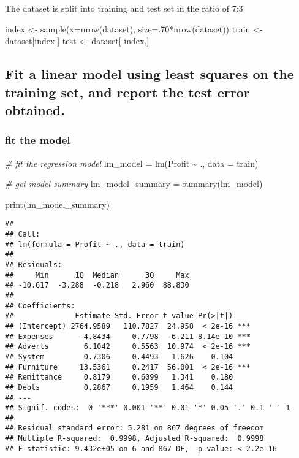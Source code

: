 \documentclass[
]{article}
\newenvironment{Shaded}{\begin{snugshade}}{\end{snugshade}}
\newcommand{\AttributeTok}[1]{\textcolor[rgb]{0.77,0.63,0.00}{#1}}
\newcommand{\CommentTok}[1]{\textcolor[rgb]{0.56,0.35,0.01}{\textit{#1}}}
\newcommand{\DecValTok}[1]{\textcolor[rgb]{0.00,0.00,0.81}{#1}}
\newcommand{\FunctionTok}[1]{\textcolor[rgb]{0.00,0.00,0.00}{#1}}
\newcommand{\NormalTok}[1]{#1}
\newcommand{\OtherTok}[1]{\textcolor[rgb]{0.56,0.35,0.01}{#1}}
\newcommand{\SpecialCharTok}[1]{\textcolor[rgb]{0.00,0.00,0.00}{#1}}
\begin{document}
The dataset is split into training and test set in the ratio of 7:3

\begin{Shaded}
\begin{Highlighting}[]
\NormalTok{index }\OtherTok{\textless{}{-}} \FunctionTok{sample}\NormalTok{(}\AttributeTok{x=}\FunctionTok{nrow}\NormalTok{(dataset), }\AttributeTok{size=}\NormalTok{.}\DecValTok{70}\SpecialCharTok{*}\FunctionTok{nrow}\NormalTok{(dataset))}
\NormalTok{train }\OtherTok{\textless{}{-}}\NormalTok{ dataset[index,]}
\NormalTok{test }\OtherTok{\textless{}{-}}\NormalTok{  dataset[}\SpecialCharTok{{-}}\NormalTok{index,]}
\end{Highlighting}
\end{Shaded}

\hypertarget{fit-a-linear-model-using-least-squares-on-the-training-set-and-report-the-test-error-obtained.}{%
\subsection{Fit a linear model using least squares on the training set,
and report the test error
obtained.}\label{fit-a-linear-model-using-least-squares-on-the-training-set-and-report-the-test-error-obtained.}}

\hypertarget{fit-the-model}{%
\subsubsection{fit the model}\label{fit-the-model}}

\begin{Shaded}
\begin{Highlighting}[]
\CommentTok{\# fit the regression model}
\NormalTok{lm\_model }\OtherTok{=} \FunctionTok{lm}\NormalTok{(Profit }\SpecialCharTok{\textasciitilde{}}\NormalTok{ ., }\AttributeTok{data =}\NormalTok{ train)}

\CommentTok{\# get model summary}
\NormalTok{lm\_model\_summary }\OtherTok{=} \FunctionTok{summary}\NormalTok{(lm\_model)}

\FunctionTok{print}\NormalTok{(lm\_model\_summary)}
\end{Highlighting}
\end{Shaded}

\begin{verbatim}
## 
## Call:
## lm(formula = Profit ~ ., data = train)
## 
## Residuals:
##     Min      1Q  Median      3Q     Max 
## -10.617  -3.288  -0.218   2.960  88.830 
## 
## Coefficients:
##              Estimate Std. Error t value Pr(>|t|)    
## (Intercept) 2764.9589   110.7827  24.958  < 2e-16 ***
## Expenses      -4.8434     0.7798  -6.211 8.14e-10 ***
## Adverts        6.1042     0.5563  10.974  < 2e-16 ***
## System         0.7306     0.4493   1.626    0.104    
## Furniture     13.5361     0.2417  56.001  < 2e-16 ***
## Remittance     0.8179     0.6099   1.341    0.180    
## Debts          0.2867     0.1959   1.464    0.144    
## ---
## Signif. codes:  0 '***' 0.001 '**' 0.01 '*' 0.05 '.' 0.1 ' ' 1
## 
## Residual standard error: 5.281 on 867 degrees of freedom
## Multiple R-squared:  0.9998, Adjusted R-squared:  0.9998 
## F-statistic: 9.432e+05 on 6 and 867 DF,  p-value: < 2.2e-16
\end{verbatim}
\end{document}
